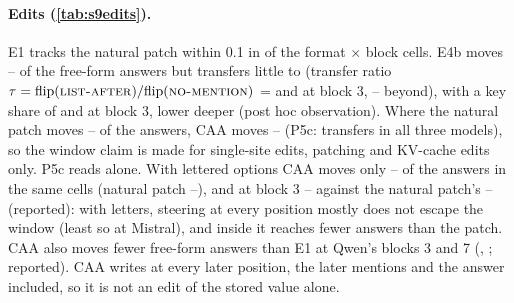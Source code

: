 \paragraph{Edits (\cref{tab:s9edits}).} E1 tracks the natural patch within 0.1 in \NqEoneWithinAll{} of the \NqEoneCellsAll{} format $\times$ block cells. E4b moves \NqEfourbNoneMin{}--\NqEfourbNoneMax{} of the free-form answers but transfers little to \fmtListA{} (transfer ratio $\tau = \text{flip}(\text{\textsc{list-after}})/\text{flip}(\text{\textsc{no-mention}})$ = \NqTauEfourbThreeMistralSeven{} and \NqTauEfourbThreeQwenSeven{} at block 3, \NqTauEfourbBeyondMin{}--\NqTauEfourbBeyondMax{} beyond), with a key share of \NqEditRkEfourbThreeMistralSeven{} and \NqEditRkEfourbThreeQwenSeven{} at block 3, lower deeper (post hoc observation). Where the natural patch moves \NqPfivecNatReadMin{}--\NqPfivecNatReadMax{} of the \fmtListA{} answers, CAA moves \NqPfivecCaaMin{}--\NqPfivecCaaMax{} (P5c: transfers in all three models), so the window claim is made for single-site edits, patching and KV-cache edits only. P5c reads \fmtListA{} alone. With lettered options CAA moves only \NqEditCaaLetterFifteenQwenSeven{}--\NqEditCaaLetterFifteenMistralSeven{} of the answers in the same cells (natural patch \NqEditNatLetterFifteenMistralSeven{}--\NqEditNatLetterElevenMistralSeven{}), and at block 3 \NqEditCaaLetterThreeQwenSeven{}--\NqEditCaaLetterThreeMistralSeven{} against the natural patch's \NqEditNatLetterThreeQwenSeven{}--\NqEditNatLetterThreeLlamaEight{} (reported): with letters, steering at every position mostly does not escape the window (least so at Mistral), and inside it reaches fewer answers than the patch. CAA also moves fewer free-form answers than E1 at Qwen's blocks 3 and 7 (\NqEditCaaNoneThreeQwenSeven{}, \NqEditCaaNoneSevenQwenSeven{}; reported). CAA writes at every later position, the later mentions and the answer included, so it is not an edit of the stored value alone.

